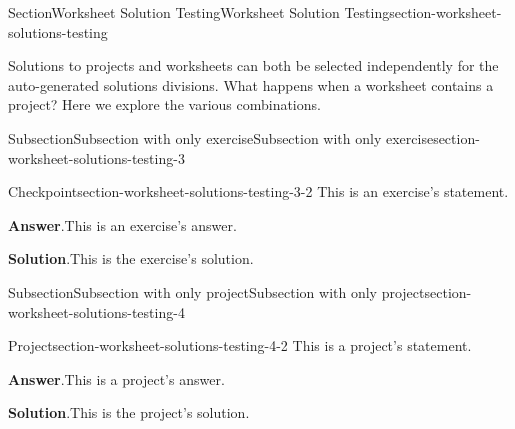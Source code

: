 \documentclass[oneside,10pt,]{article}
\newcommand{\blocktitlefont}{\relax}
\numberwithin{equation}{section}
\begin{document}
%
%
\typeout{************************************************}
\typeout{************************************************}
%
\begin{sectionptx}{Section}{Worksheet Solution Testing}{}{Worksheet Solution Testing}{}{}{section-worksheet-solutions-testing}
\begin{introduction}{}%
Solutions to projects and worksheets can both be selected independently for the auto-generated solutions divisions.  What happens when a worksheet contains a project?  Here we explore the various combinations.%
\end{introduction}%
%
%
\typeout{************************************************}
\typeout{************************************************}
%
\begin{subsectionptx}{Subsection}{Subsection with only exercise}{}{Subsection with only exercise}{}{}{section-worksheet-solutions-testing-3}
\begin{inlineexercise}{Checkpoint}{}{section-worksheet-solutions-testing-3-2}%
This is an exercise's statement.%
\par\smallskip%
\noindent\textbf{\blocktitlefont Answer}.\hypertarget{section-worksheet-solutions-testing-3-2-2}{}\quad{}This is an exercise's answer.%
\par\smallskip%
\noindent\textbf{\blocktitlefont Solution}.\hypertarget{section-worksheet-solutions-testing-3-2-3}{}\quad{}This is the exercise's solution.%
\end{inlineexercise}%
\end{subsectionptx}
%
%
\typeout{************************************************}
\typeout{************************************************}
%
\begin{subsectionptx}{Subsection}{Subsection with only project}{}{Subsection with only project}{}{}{section-worksheet-solutions-testing-4}
\begin{project}{Project}{}{section-worksheet-solutions-testing-4-2}%
This is a project's statement.%
\par\smallskip%
\noindent\textbf{\blocktitlefont Answer}.\hypertarget{section-worksheet-solutions-testing-4-2-2}{}\quad{}This is a project's answer.%
\par\smallskip%
\noindent\textbf{\blocktitlefont Solution}.\hypertarget{section-worksheet-solutions-testing-4-2-3}{}\quad{}This is the project's solution.%
\end{project}%

\end{subsectionptx}
\end{sectionptx}
\end{document}
